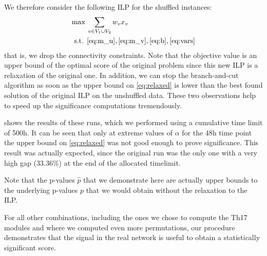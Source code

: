   We therefore consider the following ILP for the shuffled instances:
  \allowdisplaybreaks
  \begin{alignat}{3}
   \label{eq:relaxed}\max\: & \sum_{v \in V_1 \cup V_2} w_v x_v \\
   \text{s.t.}\:\: & \eqref{eq:m_u}, \eqref{eq:m_v},
  \eqref{eq:b}, \eqref{eq:vars}
  \end{alignat}
  that is, we drop the connectivity constraints. Note that the objective
  value is an upper bound of the optimal score of the original problem
  since this new ILP is a relaxation of the original one. In
  addition, we can stop the branch-and-cut algorithm as soon as the
  upper bound on \eqref{eq:relaxed} is lower than the best found
  solution of the original ILP on the unshuffled data. These two
  observations help to speed up the significance computations tremendously.

   shows the results of these runs, which we
  performed using a cumulative time limit of \unit{500}{h}. It can be seen that only
  at extreme values of $\alpha$ for the \unit{48}{h} time point the
  upper bound on \eqref{eq:relaxed} was not good enough to prove
  significance. This result was actually expected, since the original run was the only one
  with a very high gap ($33.36\%$) at the end of the allocated timelimit.

  Note that the p-values $\hat p$ that we demonstrate here are actually upper bounds to the
  underlying p-values $p$ that we would obtain without the relaxation to the ILP.

  For all other combinations, including the ones we chose to compute the Th17 modules
  and where we computed even more permutations, our procedure
  demonstrates that the signal in the real network is useful to obtain a
  statistically significant score.

